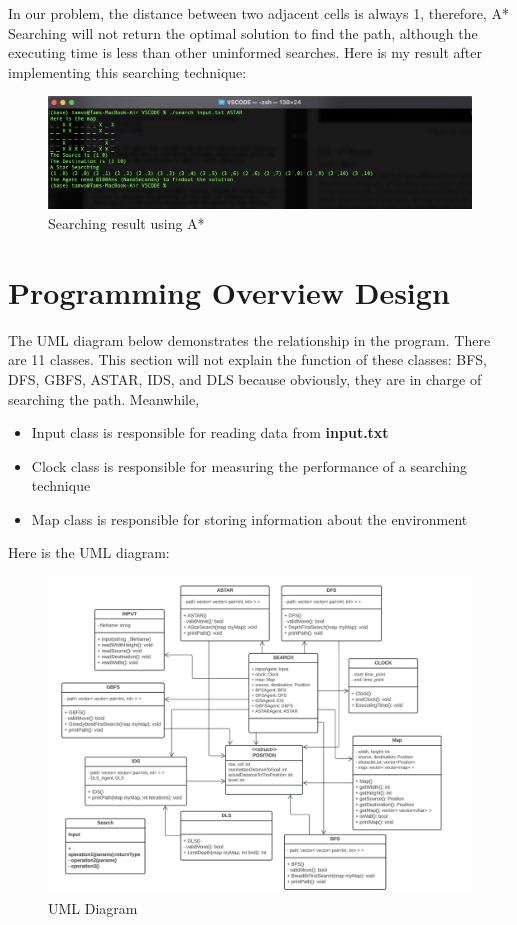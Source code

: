 \documentclass{assignment}
\begin{document}
In our problem, the distance between two adjacent cells is always 1, therefore, A* Searching will not return the optimal solution to find the path, although the executing time is less than other uninformed searches. Here is my result after implementing this searching technique:

\begin{figure}[h]
    \centering
    \includegraphics[width=1\textwidth]{./assets/ASTAR.png}
    \caption{Searching result using A* }
    \label{fig:fig13}
\end{figure}

\newpage
\section{Programming Overview Design}
The UML diagram below demonstrates the relationship in the program. There are 11 classes. This section will not explain the function of these classes: BFS, DFS, GBFS, ASTAR, IDS, and DLS because obviously, they are in charge of searching the path. Meanwhile, 

\begin{itemize}
  \item Input class is responsible for reading data from \textbf{input.txt}
  \item Clock class is responsible for measuring the performance of a searching technique
  \item Map class is responsible for storing information about the environment
\end{itemize} 

Here is the UML diagram:
\begin{figure}[h]
    \centering
    \includegraphics[width=1\textwidth]{./assets/UML.png}
    \caption{UML Diagram}
    \label{fig:fig14}
\end{figure}
\end{document}
